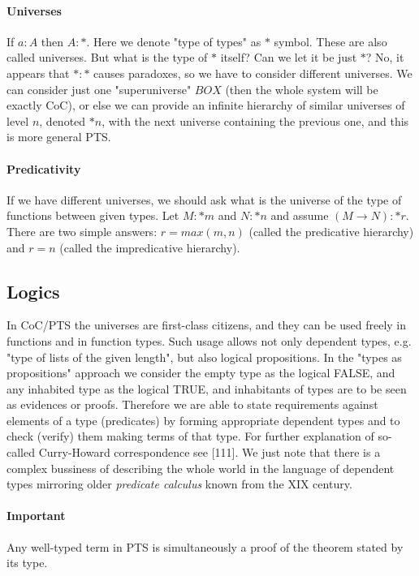 \documentclass[11pt,oneside]{article}
\begin{document}
\paragraph{Universes}
If $a : A$ then $A : *$.
Here we denote "type of types" as $*$ symbol.
These are also called universes.
But what is the type of $*$ itself? Can we let it be just $*$?
No, it appears that $* : *$ causes paradoxes, so
we have to consider different universes.
We can consider just one "superuniverse" $BOX$
(then the whole system will be exactly CoC),
or else we can provide an infinite hierarchy of similar universes
of level $n$, denoted $*{n}$,
with the next universe containing the previous one,
and this is more general PTS.

\paragraph{Predicativity}
If we have different universes, we should ask what is the universe
of the type of functions between given types.
Let $M : *{m}$ and $N : *{n}$ and assume $(M \rightarrow N) : *{r} $.
There are two simple answers:
$r = max (m, n)$ (called the predicative hierarchy) and
$r = n$ (called the impredicative hierarchy).

\subsection{Logics}
In CoC/PTS the universes are first-class citizens,
and they can be used freely in functions and in function types.
Such usage allows not only dependent types, e.g. "type of lists of the
given length", but also logical propositions.
In the "types as propositions" approach we consider the empty type
as the logical FALSE, and any inhabited type as the logical TRUE,
and inhabitants of types are to be seen as evidences or proofs.
Therefore we are able to state requirements against elements of a type
(predicates) by forming appropriate dependent types
and to check (verify) them making terms of that type.
For further explanation of so-called Curry-Howard correspondence
see [111].
We just note that there is a complex bussiness of
describing the whole world in the language of dependent types
mirroring older {\em predicate calculus} known from the XIX century.

\paragraph{Important}
Any well-typed term in PTS is simultaneously a proof of the theorem stated by its type.
\end{document}
